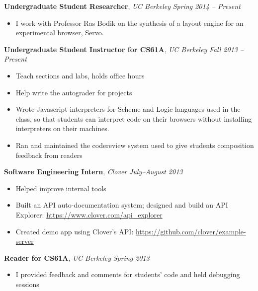 \documentclass[9pt]{article}
\newenvironment{changemargin}[2]{%
  \begin{list}{}{%
      \setlength{\topsep}{0pt}%
      \setlength{\leftmargin}{#1}%
      \setlength{\rightmargin}{#2}%
      \setlength{\listparindent}{\parindent}%
      \setlength{\itemindent}{\parindent}%
      \setlength{\parsep}{\parskip}%
    }%
  \item[]}{\end{list}
}
\newenvironment{body} {
  \vspace*{-16pt}
  \begin{changemargin}{-0.25in}{-0.5in}
  }
  {\end{changemargin}
}
\begin{document}
\begin{body}
  \vspace{14pt}

  \textbf{Undergraduate Student Researcher}, \emph{UC Berkeley} \hfill \emph{Spring 2014 -- Present}\\
  \vspace*{-4pt}
  \begin{itemize} \itemsep -0pt  %
  \item I work with Professor Ras Bodik on the synthesis of a layout engine for
    an experimental browser, Servo.
  \end{itemize}

  \textbf{Undergraduate Student Instructor for CS61A}, \emph{UC Berkeley} \hfill \emph{Fall 2013 -- Present}\\
  \vspace*{-4pt}
  \begin{itemize} \itemsep -0pt  %
  \item Teach sections and labs, holds office hours
  \item Help write the autograder for projects
  \item Wrote Javascript interpreters for Scheme and Logic languages used in the
    class, so that students can interpret code on their browsers without
    installing interpreters on their machines.
  \item Ran and maintained the codereview system used to give students
    composition feedback from readers
  \end{itemize}

  \textbf{Software Engineering Intern}, \emph{Clover} \hfill \emph{July--August 2013}\\
  \vspace*{-4pt}
  \begin{itemize} \itemsep -0pt  %
  \item Helped improve internal tools
  \item Built an API auto-documentation system; designed and build an API     Explorer: \url{https://www.clover.com/api_explorer}
  \item Created demo app using Clover's API:     \url{https://github.com/clover/example-server}
  \end{itemize}

  \textbf{Reader for CS61A}, \emph{UC Berkeley} \hfill \emph{Spring 2013}\\
  \vspace*{-4pt}
  \begin{itemize} \itemsep -0pt  %
  \item I provided feedback and comments for students' code and held debugging     sessions
  \end{itemize}


\end{body}
\end{document}
